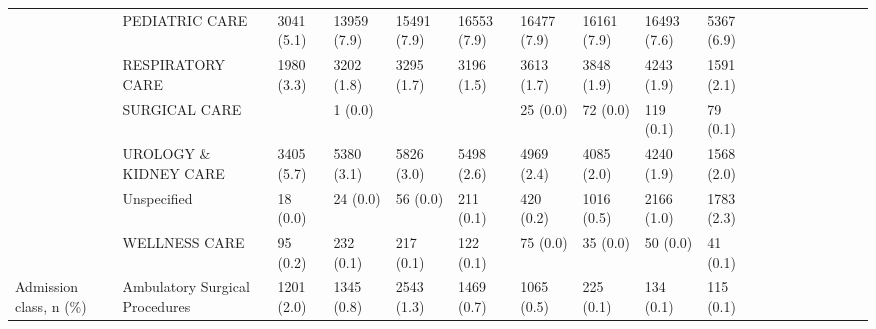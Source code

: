 \begin{tabular}{llllllllllllllllll}
                                       & PEDIATRIC CARE &                   3041 (5.1) &     13959 (7.9) &     15491 (7.9) &     16553 (7.9) &     16477 (7.9) &     16161 (7.9) &     16493 (7.6) &     5367 (6.9) &                   &                    &                    &                    &                    &                     &                     &                     \\
                                       & RESPIRATORY CARE &                   1980 (3.3) &      3202 (1.8) &      3295 (1.7) &      3196 (1.5) &      3613 (1.7) &      3848 (1.9) &      4243 (1.9) &     1591 (2.1) &                   &                    &                    &                    &                    &                     &                     &                     \\
                                       & SURGICAL CARE &                              &         1 (0.0) &                 &                 &        25 (0.0) &        72 (0.0) &       119 (0.1) &       79 (0.1) &                   &                    &                    &                    &                    &                     &                     &                     \\
                                       & UROLOGY \& KIDNEY CARE &                   3405 (5.7) &      5380 (3.1) &      5826 (3.0) &      5498 (2.6) &      4969 (2.4) &      4085 (2.0) &      4240 (1.9) &     1568 (2.0) &                   &                    &                    &                    &                    &                     &                     &                     \\
                                       & Unspecified &                     18 (0.0) &        24 (0.0) &        56 (0.0) &       211 (0.1) &       420 (0.2) &      1016 (0.5) &      2166 (1.0) &     1783 (2.3) &                   &                    &                    &                    &                    &                     &                     &                     \\
                                       & WELLNESS CARE &                     95 (0.2) &       232 (0.1) &       217 (0.1) &       122 (0.1) &        75 (0.0) &        35 (0.0) &        50 (0.0) &       41 (0.1) &                   &                    &                    &                    &                    &                     &                     &                     \\
Admission class, n (\%) & Ambulatory Surgical Procedures &                   1201 (2.0) &      1345 (0.8) &      2543 (1.3) &      1469 (0.7) &      1065 (0.5) &       225 (0.1) &       134 (0.1) &      115 (0.1) &                   &                    &                    &                    &                    &                     &                     &                     \\

\end{tabular}
